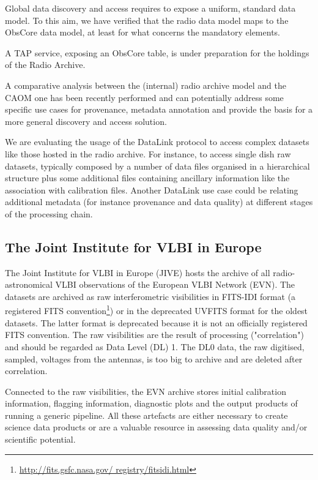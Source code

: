 \documentclass[11pt,a4paper]{ivoa}
\begin{document}
Global data discovery and access requires to expose a uniform, standard data model. To this aim, we have 
verified that the radio data model maps to the ObsCore data model, at least  for what concerns the 
mandatory elements.

A TAP service, exposing an ObsCore table, is under preparation for the holdings of the Radio Archive.

A comparative analysis between the (internal) radio archive model and the CAOM one has been recently 
performed and can potentially address some specific use cases for provenance, metadata annotation and 
provide the basis for a more general discovery and access solution.

We are evaluating the usage of the DataLink protocol to access complex datasets like those hosted in the 
radio archive. For instance, to access single dish raw datasets, typically composed by a number of data 
files organised in a hierarchical structure plus some additional files containing ancillary information 
like the association with calibration files. Another DataLink use case could be relating additional 
metadata (for instance provenance and data quality) at different stages of the processing chain.

\subsection{The Joint Institute for VLBI in Europe}
\label{sec:JIVE}
The Joint Institute for VLBI in Europe (JIVE) hosts the archive of all radio-astronomical VLBI 
observations of the European VLBI Network (EVN). The datasets are archived as raw interferometric 
visibilities in FITS-IDI format (a registered FITS convention\footnote{\url{ http://fits.gsfc.nasa.gov/
registry/fitsidi.html}}) or in the deprecated UVFITS format for the oldest datasets. The latter format 
is deprecated because it is not an officially registered FITS convention. The raw visibilities are the 
result of processing ("correlation") and should be regarded as Data Level (DL) 1. The DL0 data, the raw 
digitised, sampled, voltages from the antennas, is too big to archive and are deleted after correlation.

Connected to the raw visibilities, the EVN archive stores initial calibration information, flagging 
information, diagnostic plots and the output products of running a generic pipeline. All these artefacts 
are either necessary to create science data products or are a valuable resource in assessing data 
quality and/or scientific potential.
\end{document}
